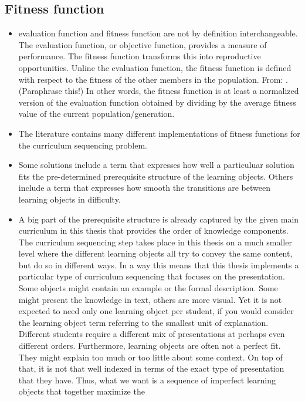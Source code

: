 \subsection{Fitness function}
\begin{itemize}
	\item evaluation function and fitness function are not by definition
		interchangeable. The evaluation function, or objective function,
		provides a measure of performance. The fitness function transforms this
		into reproductive opportunities. Unline the evaluation function, the
		fitness function is defined with respect to the fitness of the other
		members in the population. From: \citet{Whitley1994}. (Paraphrase
		this!) In other words, the fitness function is at least a normalized
		version of the evaluation function obtained by dividing by the average
		fitness value of the current population/generation.
	\item The literature contains many different implementations of fitness
		functions for the curriculum sequencing problem. 
	\item Some solutions include a term that expresses how well a particuluar
		solution fits the pre-determined prerequisite structure of the learning
		objects. Others include a term that expresses how smooth the transitions
		are between learning objects in difficulty.
	\item A big part of the prerequisite structure is already captured by the
		given main curriculum in this thesis that provides the order of
		knowledge components. The curriculum sequencing step takes place
		in this thesis on a much smaller level where the different learning
		objects all try to convey the same content, but do so in different
		ways. In a way this means that this thesis implements a particular type
		of curriculum sequencing that focuses on the presentation. Some objects
		might contain an example or the formal description. Some might present
		the knowledge in text, others are more visual. Yet it is not expected
		to need only one learning object per student, if you would consider
		the learning object term referring to the smallest unit of explanation.
		Different students require a different mix of presentations at perhaps
		even different orders. Furthermore, learning objects are often not
		a perfect fit. They might explain too much or too little about some
		context. On top of that, it is not that well indexed in terms of the
		exact type of presentation that they have. Thus, what we want is a
		sequence of imperfect learning objects that together maximize the

\end{itemize}
